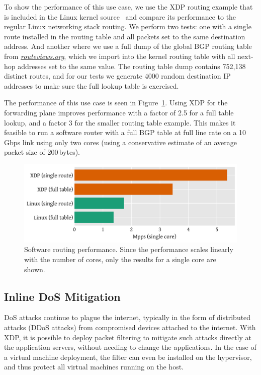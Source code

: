 \documentclass[10pt,sigconf,anonymous]{acmart}
\begin{document}
To show the performance of this use case, we use the XDP routing example that is
included in the Linux kernel source~\cite{fwd-example} and compare its
performance to the regular Linux networking stack routing. We perform two tests:
one with a single route installed in the routing table and all packets set to
the same destination address. And another where we use a full dump of the global
BGP routing table from \emph{\url{routeviews.org}}, which we import into the
kernel routing table with all next-hop addresses set to the same value. The
routing table dump contains 752,138 distinct routes, and for our tests we
generate 4000 random destination IP addresses to make sure the full lookup table
is exercised.

The performance of this use case is seen in Figure~\ref{fig:router-fwd}. Using
XDP for the forwarding plane improves performance with a factor of 2.5 for a
full table lookup, and a factor 3 for the smaller routing table example. This
makes it feasible to run a software router with a full BGP table at full line
rate on a 10\,Gbps link using only two cores (using a conservative estimate of
an average packet size of 200\,bytes).

\begin{figure}[t]
\centering
\includegraphics[width=\linewidth]{figures/router-fwd.pdf}
\caption{\label{fig:router-fwd} Software routing performance. Since the
  performance scales linearly with the number of cores, only the results for a
  single core are shown.}
\end{figure}


\subsection{Inline DoS Mitigation}
\label{sec:dos-usecase}
DoS attacks continue to plague the internet, typically in the form of
distributed attacks (DDoS attacks) from compromised devices attached to the
internet. With XDP, it is possible to deploy packet filtering to mitigate such
attacks directly at the application servers, without needing to change the
applications. In the case of a virtual machine deployment, the filter can even
be installed on the hypervisor, and thus protect all virtual machines running on
the host.
\end{document}
